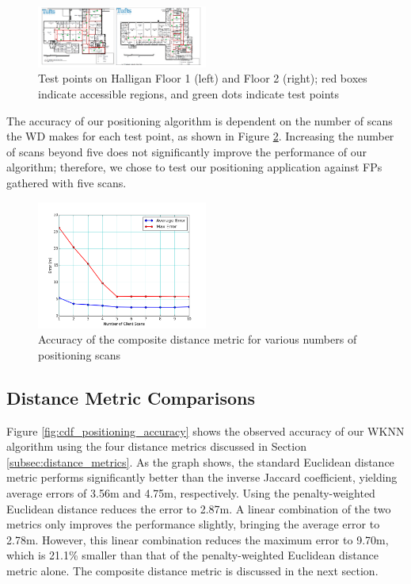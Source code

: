 \documentclass[conference]{IEEEtran}
\begin{document}
\begin{figure}[H]
  \centering
    \includegraphics[width=0.5\textwidth]{testpoints}
   \caption{Test points on Halligan Floor 1 (left) and Floor 2 (right); red boxes indicate accessible regions, and green dots indicate test points}
   \label{fig:test_points}
\end{figure}

The accuracy of our positioning algorithm is dependent on the number of scans the WD makes for each test point, as shown in Figure \ref{fig:composite_accuracy}. Increasing the number of scans beyond five does not significantly improve the performance of our algorithm; therefore, we chose to test our positioning application against FPs gathered with five scans.

\begin{figure}[H]
  \centering
    \includegraphics[width=0.5\textwidth]{pull_errors.png}
   \caption{Accuracy of the composite distance metric for various numbers of positioning scans}
   \label{fig:composite_accuracy}
\end{figure}

\subsection{Distance Metric Comparisons}
Figure \ref{fig:cdf_positioning_accuracy} shows the observed accuracy of our WKNN algorithm using the four distance metrics discussed in Section \ref{subsec:distance_metrics}. As the graph shows, the standard Euclidean distance metric performs significantly better than the inverse Jaccard coefficient, yielding average errors of 3.56m and 4.75m, respectively. Using the penalty-weighted Euclidean distance reduces the error to 2.87m. A linear combination of the two metrics only improves the performance slightly, bringing the average error to 2.78m. However, this linear combination reduces the maximum error to 9.70m, which is 21.1\% smaller than that of the penalty-weighted Euclidean distance metric alone. The composite distance metric is discussed in the next section.
\end{document}
